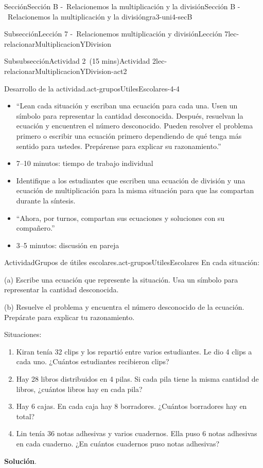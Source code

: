 \documentclass[oneside,10pt,]{article}
\newcommand{\blocktitlefont}{\relax}
\begin{document}
\begin{sectionptx}{Sección}{Sección B -~Relacionemos la multiplicación y la división}{}{Sección B -~Relacionemos la multiplicación y la división}{}{}{gra3-uni4-secB}
\begin{subsectionptx}{Subsección}{Lección 7 -~Relacionemos multiplicación y división}{}{Lección 7}{}{}{lec-relacionarMultiplicacionYDivision}
\begin{subsubsectionptx}{Subsubsección}{Actividad 2~(15 mins)}{}{Actividad 2}{}{}{lec-relacionarMultiplicacionYDivision-act2}
\begin{paragraphs}{Desarrollo de la actividad.}{act-gruposUtilesEscolares-4-4}%
%
\begin{itemize}[label=\textbullet]
\item{}``Lean cada situación y escriban una ecuación para cada una. Usen un símbolo para representar la cantidad desconocida. Después, resuelvan la ecuación y encuentren el número desconocido. Pueden resolver el problema primero o escribir una ecuación primero dependiendo de qué tenga más sentido para ustedes. Prepárense para explicar su razonamiento.''%
\item{}7–10 minutos: tiempo de trabajo individual%
\item{}Identifique a los estudiantes que escriben una ecuación de división y una ecuación de multiplicación para la misma situación para que las compartan durante la síntesis.%
\item{}``Ahora, por turnos, compartan sus ecuaciones y soluciones con su compañero.''%
\item{}3–5 minutos: discusión en pareja%
\end{itemize}
\end{paragraphs}%
\begin{activity}{Actividad}{Grupos de útiles escolares.}{act-gruposUtilesEscolares}%
En cada situación:%
\par
(a) Escribe una ecuación que represente la situación. Usa un símbolo para representar la cantidad desconocida.%
\par
(b) Resuelve el problema y encuentra el número desconocido de la ecuación. Prepárate para explicar tu razonamiento.%
\par
Situaciones:%
%
\begin{enumerate}
\item{}Kiran tenía 32 clips y los repartió entre varios estudiantes. Le dio 4 clips a cada uno. ¿Cuántos estudiantes recibieron clips?%
\item{}Hay 28 libros distribuidos en 4 pilas. Si cada pila tiene la misma cantidad de libros, ¿cuántos libros hay en cada pila?%
\item{}Hay 6 cajas. En cada caja hay 8 borradores. ¿Cuántos borradores hay en total?%
\item{}Lin tenía 36 notas adhesivas y varios cuadernos. Ella puso 6 notas adhesivas en cada cuaderno. ¿En cuántos cuadernos puso notas adhesivas?%
\end{enumerate}
\par\smallskip%
\noindent\textbf{\blocktitlefont Solución}.\hypertarget{act-gruposUtilesEscolares-3}{}\quad{}%

\end{activity}
\end{subsubsectionptx}
\end{subsectionptx}
\end{sectionptx}
\end{document}
